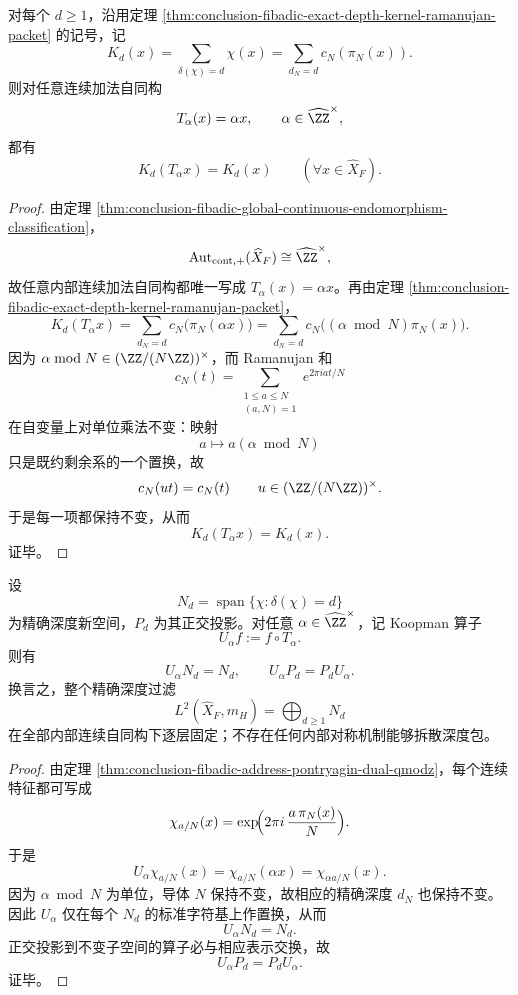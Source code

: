 \begin{theorem}\label{thm:conclusion-fibadic-depth-packet-kernel-unit-invariance}
对每个 \(d\ge 1\)，沿用定理 \ref{thm:conclusion-fibadic-exact-depth-kernel-ramanujan-packet} 的记号，记
\[
K_d(x)=\sum_{\delta(\chi)=d}\chi(x)
=
\sum_{d_N=d}c_N(\pi_N(x)).
\]
则对任意连续加法自同构
\[
T_\alpha(x)=\alpha x,
\qquad
\alpha\in \widehat{\ZZ}^{\times},
\]
都有
\[
K_d(T_\alpha x)=K_d(x)
\qquad (\forall x\in \widehat X_F).
\]
\end{theorem}
\begin{proof}
由定理 \ref{thm:conclusion-fibadic-global-continuous-endomorphism-classification}，
\[
\operatorname{Aut}_{\mathrm{cont},+}(\widehat X_F)\cong \widehat{\ZZ}^{\times},
\]
故任意内部连续加法自同构都唯一写成 \(T_\alpha(x)=\alpha x\)。再由定理 \ref{thm:conclusion-fibadic-exact-depth-kernel-ramanujan-packet}，
\[
K_d(T_\alpha x)
=
\sum_{d_N=d}c_N\!\bigl(\pi_N(\alpha x)\bigr)
=
\sum_{d_N=d}c_N\!\bigl((\alpha\bmod N)\pi_N(x)\bigr).
\]
因为 \(\alpha\bmod N\in (\ZZ/(N\ZZ))^{\times}\)，而 Ramanujan 和
\[
c_N(t)=\sum_{\substack{1\le a\le N\\ (a,N)=1}}e^{2\pi i at/N}
\]
在自变量上对单位乘法不变：映射
\[
a\longmapsto a(\alpha\bmod N)
\]
只是既约剩余系的一个置换，故
\[
c_N(ut)=c_N(t)
\qquad
u\in (\ZZ/(N\ZZ))^{\times}.
\]
于是每一项都保持不变，从而
\[
K_d(T_\alpha x)=K_d(x).
\]
证毕。
\end{proof}

\begin{corollary}\label{cor:conclusion-fibadic-depth-newspace-mobius-projection-unit-invariance}
设
\[
N_d=\operatorname{span}\{\chi:\delta(\chi)=d\}
\]
为精确深度新空间，\(P_d\) 为其正交投影。对任意 \(\alpha\in \widehat{\ZZ}^{\times}\)，记 Koopman 算子
\[
U_\alpha f:=f\circ T_\alpha.
\]
则有
\[
U_\alpha N_d=N_d,
\qquad
U_\alpha P_d=P_dU_\alpha.
\]
换言之，整个精确深度过滤
\[
L^2(\widehat X_F,m_H)=\bigoplus_{d\ge 1}N_d
\]
在全部内部连续自同构下逐层固定；不存在任何内部对称机制能够拆散深度包。
\end{corollary}
\begin{proof}
由定理 \ref{thm:conclusion-fibadic-address-pontryagin-dual-qmodz}，每个连续特征都可写成
\[
\chi_{a/N}(x)=\exp\!\Bigl(2\pi i\,\frac{a\,\pi_N(x)}{N}\Bigr).
\]
于是
\[
U_\alpha\chi_{a/N}(x)=\chi_{a/N}(\alpha x)=\chi_{\alpha a/N}(x).
\]
因为 \(\alpha\bmod N\) 为单位，导体 \(N\) 保持不变，故相应的精确深度 \(d_N\) 也保持不变。因此 \(U_\alpha\) 仅在每个 \(N_d\) 的标准字符基上作置换，从而
\[
U_\alpha N_d=N_d.
\]
正交投影到不变子空间的算子必与相应表示交换，故
\[
U_\alpha P_d=P_dU_\alpha.
\]
证毕。
\end{proof}
